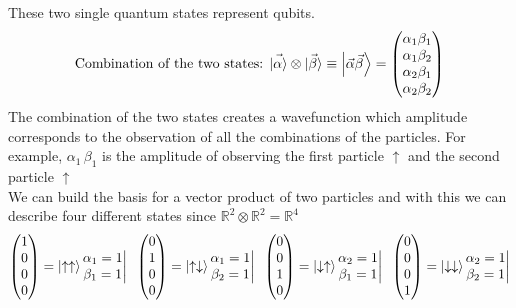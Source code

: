 These two single quantum states represent qubits.\\
\[\text{Combination of the two states: }
\vec{\ket{\alpha}}\otimes\vec{\ket{\beta}}\equiv{\ket{\vec{\alpha}\vec{\beta}}}=\begin{pmatrix}\alpha_1\beta_1\\\alpha_1\beta_2\\\alpha_2\beta_1\\\alpha_2\beta_2\end{pmatrix}
\]
The combination of the two states creates a wavefunction which amplitude corresponds to the observation of all the combinations of the particles. For example, $\alpha_1\,\beta_1$ is the amplitude of observing the first particle $\uparrow$ and the second particle $\uparrow$ \\
We can build the basis for a vector product of two particles and with this we can describe four different states since $\mathbb{R}^2\otimes\mathbb{R}^2=\mathbb{R}^4$
\[
\begin{pmatrix}1\\0\\0\\0\end{pmatrix}=\ket{\uparrow\uparrow}\begin{matrix}\alpha_1=1\\\beta_1=1\end{matrix}\bigg| \;\;
\begin{pmatrix}0\\1\\0\\0\end{pmatrix}=\ket{\uparrow\downarrow}\begin{matrix}\alpha_1=1\\\beta_2=1\end{matrix}\bigg| \;\;
\begin{pmatrix}0\\0\\1\\0\end{pmatrix}=\ket{\downarrow\uparrow}\begin{matrix}\alpha_2=1\\\beta_1=1\end{matrix}\bigg| \;\;
\begin{pmatrix}0\\0\\0\\1\end{pmatrix}=\ket{\downarrow\downarrow}\begin{matrix}\alpha_2=1\\\beta_2=1\end{matrix}\bigg|
\]
